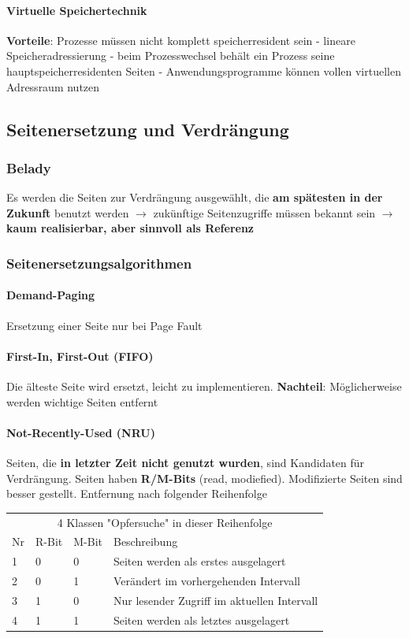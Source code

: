 \documentclass[11pt,a4paper,landscape]{article}
\begin{document}
\begin{multicols*}{3}
	\paragraph{Virtuelle Speichertechnik} \textbf{Vorteile}: Prozesse müssen nicht komplett speicherresident sein - lineare Speicheradressierung - beim Prozesswechsel behält ein Prozess seine hauptspeicherresidenten Seiten - Anwendungsprogramme können vollen virtuellen Adressraum nutzen
	\subsection{Seitenersetzung und Verdrängung}
	\subsubsection{Belady} Es werden die Seiten zur Verdrängung ausgewählt, die \textbf{am spätesten in der Zukunft} benutzt werden $\rightarrow$ zukünftige Seitenzugriffe müssen bekannt sein $\rightarrow$ \textbf{kaum realisierbar, aber sinnvoll als Referenz}
	\subsubsection{Seitenersetzungsalgorithmen}
	\paragraph{Demand-Paging} Ersetzung einer Seite nur bei Page Fault
	\paragraph{First-In, First-Out (FIFO)} Die älteste Seite wird ersetzt, leicht zu implementieren. \textbf{Nachteil}: Möglicherweise werden wichtige Seiten entfernt
	\paragraph{Not-Recently-Used (NRU)} Seiten, die \textbf{in letzter Zeit nicht genutzt wurden}, sind Kandidaten für Verdrängung. Seiten haben \textbf{R/M-Bits} (read, modiefied). Modifizierte Seiten sind besser gestellt. Entfernung nach folgender Reihenfolge
	\begin{tabularx}{\columnwidth}{|l|l|l|X|}
		\cline{1-4}
		\multicolumn{4}{|c|}{4 Klassen "Opfersuche" in dieser Reihenfolge} \\
		\cline{1-4}
		Nr & R-Bit & M-Bit & Beschreibung\\
		\cline{1-4}
		1 & 0 & 0 & Seiten werden als erstes ausgelagert \\
		\cline{1-4}
		2 & 0 & 1 & Verändert im vorhergehenden Intervall \\
		\cline{1-4}
		3 & 1 & 0 & Nur lesender Zugriff im aktuellen Intervall \\
		\cline{1-4}
		4 & 1 & 1 & Seiten werden als letztes ausgelagert \\
		\cline{1-4}
	\end{tabularx}

\end{multicols*}
\end{document}
